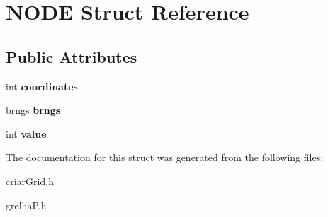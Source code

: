\hypertarget{structNODE}{}\section{N\+O\+DE Struct Reference}
\label{structNODE}
\subsection*{Public Attributes}
\begin{DoxyCompactItemize}
\item 
\mbox{\label{structNODE_adb1bfcc556207c23ca04dde93387cb28}} 
int {\bfseries coordinates}
\item 
\mbox{\label{structNODE_ab094ae26de00d3517f5643f4fd19851e}} 
brngs {\bfseries brngs}
\item 
\mbox{\label{structNODE_aa584c9f9072f514bc24b2a86cd00bf79}} 
int {\bfseries value}
\end{DoxyCompactItemize}


The documentation for this struct was generated from the following files\+:\begin{DoxyCompactItemize}
\item 
criar\+Grid.\+h\item 
grelha\+P.\+h\end{DoxyCompactItemize}

